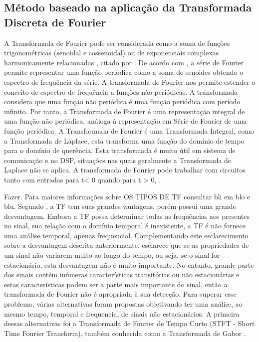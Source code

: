 \subsection{Método baseado na aplicação da Transformada Discreta de Fourier}
A Transformada de Fourier pode ser considerada como a soma de funções trigonométricas (senoidal e cossenoidal) ou de exponenciais complexas harmonicamente relacionadas %
, citado por \cite{BAC11}.
De acordo com \cite{SAD03}, a série de Fourier permite representar uma função periódica como a soma de senoides obtendo o espectro de frequência da série. A transformada de Fourier nos permite estender o conceito de espectro de frequência a funções não periódicas. A transformada considera que uma função não periódica é uma função periódica com período infinito. Por tanto, a Transformada de Fourier é uma representação integral de uma função não periódica, análoga à representação em Série de Fourier de uma função periódica.
A Transformada de Fourier é uma Transformada Integral, como a Transformada de Laplace, esta transforma uma função do domínio de tempo para o domínio de querência. Esta transformada é muito útil em sistema de comunicação e no DSP, situações nas quais geralmente a Transformada de Laplace não se aplica. A transformada de Fourier pode trabalhar com circuitos tanto com entradas para t< 0 quando para t > 0, \cite{SAD03}.
\par \color{red}
Fazer. Para maiores informações sobre OS TIPOS DE TF consultar bli em blo e blu.
\color{black}
Segundo \cite{OLI07}, a TF tem suas grandes vantagens, porém possui uma grande desvantagem. Embora a TF possa determinar todas as frequências aos presentes no sinal, sua relação com o domínio temporal é inexistente, a TF é não fornece uma análise temporal, apenas frequencial.
Complementando este esclarecimento sobre a desvantagem descrita anteriormente, \cite{MEN08} esclarece que se as propriedades de um sinal não variarem muito ao longo do tempo, ou seja, se o sinal for estacionário, esta desvantagem não é muito importante. No entanto, grande parte dos sinais contêm inúmeras características transitórias ou não estacionárias e estas características podem ser a parte mais importante do sinal, então a transformada de Fourier não é apropriada à sua detecção. 
Para superar esse problema, várias alternativas foram propostas objetivando ter uma análise, ao mesmo tempo, temporal e frequencial de sinais não estacionários. A primeira dessas alternativas foi a Transformada de Fourier de Tempo Curto (STFT - Short Time Fourier Transform), também conhecida como a Transformada de Gabor \cite{OLI07}.
